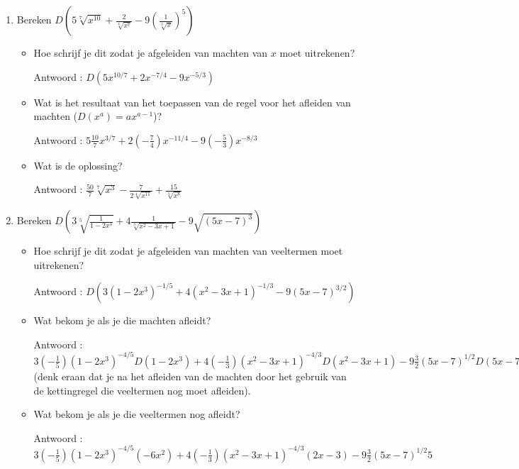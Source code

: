 \documentclass{article}
\begin{document}
\begin{enumerate}

\item Bereken $D \left( 5\sqrt[7] {x^{10}}+\frac {2}{\sqrt[4]{x^7}}-9 \left( \frac {1}{\sqrt [3]{x}}  \right)^5 \right)$

\begin{itemize}
\item Hoe schrijf je dit zodat je afgeleiden van machten van $x$ moet uitrekenen?

Antwoord : $D \left(  5x^{10/7}+2x^{-7/4}-9x^{-5/3}  \right)$

\item Wat is het resultaat van het toepassen van de regel voor het afleiden van machten ($D(x^a)=ax^{a-1}$)?

Antwoord : $5\frac{10}{7}x^{3/7}+2\left( -\frac{7}{4} \right)x^{-11/4}-9\left(  -\frac{5}{3}  \right) x^{-8/3}$

\item Wat is de oplossing?

Antwoord : $\frac {50}{7}\sqrt[7]{x^3}-\frac{7}{2\sqrt[4]{x^{11}}}+\frac{15}{\sqrt[3]{x^8}}$

\end{itemize}

\item Bereken $D \left(  3 \sqrt[5]{\frac{1}{1-2x^3}}+4\frac{1}{\sqrt[3]{x^2-3x+1}}-9\sqrt{(5x-7)^3}  \right)$

\begin{itemize}

\item Hoe schrijf je dit zodat je afgeleiden van machten van veeltermen moet uitrekenen?

Antwoord : $D \left( 3 \left(  1-2x^3 \right)^{-1/5}+4 \left( x^2-3x+1  \right)^{-1/3}-9 \left(  5x-7 \right)^{3/2}  \right)$

\item Wat bekom je als je die machten afleidt? 

Antwoord : $3\left(- \frac{1}{5} \right)\left( 1-2x^3  \right)^{-4/5}D\left( 1-2x^3  \right)+4\left( -\frac{1}{3}  \right)\left( x^2-3x+1  \right)^{-4/3}D\left( x^2-3x+1  \right)-9\frac{3}{2}\left( 5x-7  \right)^{1/2}D(5x-7)$ (denk eraan dat je na het afleiden van de machten door het gebruik van de kettingregel die veeltermen nog moet afleiden).

\item Wat bekom je als je die veeltermen nog afleidt?

Antwoord : $3\left(- \frac{1}{5} \right)\left( 1-2x^3  \right)^{-4/5}\left( -6x^2  \right)+4\left( -\frac{1}{3}  \right)\left( x^2-3x+1  \right)^{-4/3}\left(2 x-3  \right)-9\frac{3}{2}\left( 5x-7  \right)^{1/2}5$


\end{itemize}
\end{enumerate}
\end{document}
